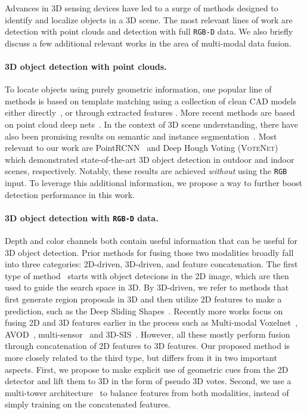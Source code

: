 \documentclass[10pt,twocolumn,letterpaper]{article}
\newcommand{\votenet}{\textsc{VoteNet}\xspace}
\newcommand{\rgbd}{\texttt{RGB-D}\xspace}
\newcommand{\rgb}{\texttt{RGB}\xspace}
\begin{document}
Advances in 3D sensing devices have led to a surge of methods designed to identify and localize objects in a 3D scene.
The most relevant lines of work are detection with point clouds and detection with full \rgbd data. We also briefly discuss a few additional relevant works in the area of multi-modal data fusion.

\paragraph{3D object detection with point clouds.}
To locate objects using purely geometric information, one popular line of methods is based on template matching using a collection of clean CAD models either directly~\cite{li2015database,Indoor2012,litany2015asist}, or through extracted features \cite{song2014sliding,avetisyan2019scan2cad}.
More recent methods are based on point cloud deep nets~\cite{qi2017pointnet,zhou2018voxelnet,lang2019pointpillars,shi2018pointrcnn,voteNet}.
In the context of 3D scene understanding, there have also been promising results on semantic and instance segmentation~\cite{yi2018gspn,choy20194d,graham20183d}.
Most relevant to our work are PointRCNN~\cite{shi2018pointrcnn} and Deep Hough Voting (\votenet)~\cite{voteNet} which demonstrated state-of-the-art 3D object detection in outdoor and indoor scenes, respectively. Notably, these results are achieved \emph{without} using the \rgb input. To leverage this additional information, we propose a way to further boost detection performance in this work.  

\paragraph{3D object detection with \rgbd data.}
Depth and color channels both contain useful information that can be useful for 3D object detection. Prior methods for fusing those two modalities broadly fall into three categories: 2D-driven, 3D-driven, and feature concatenation. The first type of method~\cite{lahoud20172d,qi2018frustum,deng2017amodal,xu2018pointfusion} starts with object detecions in the 2D image, which are then used to guide the search space in 3D. By 3D-driven, we refer to methods that first generate region proposals in 3D and then utilize 2D features to make a prediction, such as the Deep Sliding Shapes~\cite{song2016deep}. Recently more works focus on fusing 2D and 3D features earlier in the process such as Multi-modal Voxelnet~\cite{wang2019densefusion}, AVOD~\cite{ku2018joint}, multi-sensor~\cite{liang2018deep} and 3D-SIS~\cite{hou20193d}. However, all these mostly perform fusion through concatenation of 2D features to 3D features. Our proposed method is more closely related to the third type, but differs from it in two important aspects. First, we propose to make explicit use of geometric cues from the 2D detector and lift them to 3D in the form of pseudo 3D votes. Second, we use a multi-tower architecture~\cite{wang2019makes} to balance features from both modalities, instead of simply training on the concatenated features.
\end{document}
